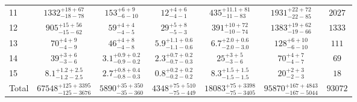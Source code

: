 \begin{tabular}{l c c c c c c }
11 & 
$1332^{+18+67}_{-18-78}$ &
$153^{+6+9}_{-6-10}$ & 
$12^{+4+6}_{-4-1}$ &  
$435^{+11.1+81}_{-11-83}$ &
$1931^{+22+72}_{-22-85}$ & 
$2027$\\
\rule{0pt}{2.75ex}

12 & 
$905^{+15+56}_{-15-62}$ & 
$59^{+4+4}_{-4-5}$ & 
$29^{+5+8}_{-5-3}$ &  
$391^{+10+72}_{-10-74}$ &
$1383^{+19+62}_{-19-66}$ & 
$1333$\\
\rule{0pt}{2.75ex}

13 & 
$70^{+4+9}_{-4-9}$ &
$46^{+4+8}_{-4-8}$ & 
$5.9^{+1.1+0.6}_{-1.1-0.6}$ & 
$6.7^{+2.0+0.6}_{-2.0-3.0}$ &  
$128^{+6+10}_{-6-10}$ & 
$111$\\
\rule{0pt}{2.75ex}

14 & 
$39^{+3+6}_{-3-6}$ &
$3.1^{+0.9+0.2}_{-0.9-0.2}$ & 
$2.3^{+0.7+0.2}_{-0.7-0.3}$ &  
$25^{+3+5}_{-3-6}$ &
$70^{+4+7}_{-4-7}$ & 
$69$\\
\rule{0pt}{2.75ex}

15 & 
$8.1^{+1.2+2.5}_{-1.2-2.5}$ & 
$2.7^{+0.8+0.4}_{-0.8-0.3}$ & 
$0.8^{+0.2+0.2}_{-0.2-0.2}$ & 
$8.3^{+1.5+1.5}_{-1.5-1.5}$ & 
$20^{+2+3}_{-2-3}$ & 
$18$\\
\rule{0pt}{2.75ex}

Total & 
$67548^{+125+3395}_{-125-3676}$ &  
$5890^{+35+350}_{-35-360}$ & 
$4348^{+75+510}_{-75-449}$ & 
$18083^{+75+3398}_{-75-3405}$ &
$95870^{+167+4843}_{-167-5044}$ & 
$93072$\\
\hline
\end{tabular}
